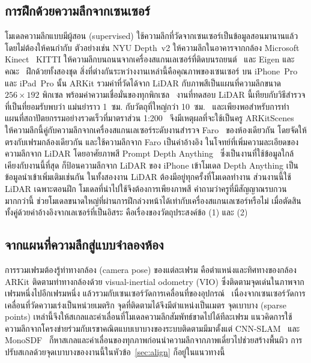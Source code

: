 \subsection{การฝึกด้วยความลึกจากเซนเซอร์}
โมเดลความลึกแบบมีผู้สอน (supervised) ใช้ความลึกที่วัดจากเซนเซอร์เป็นข้อมูลสอนมานานแล้ว โดยไม่ต้องให้คนกำกับ
ตัวอย่างเช่น NYU Depth~v2 ให้ความลึกในอาคารจากกล้อง Microsoft Kinect~\cite{nyuv2} KITTI ให้ความลึกบนถนนจากเครื่องสแกนเลเซอร์ที่ติดบนรถยนต์~\cite{kitti}
และ Eigen และคณะ~\cite{eigen14} ฝึกด้วยทั้งสองชุด สิ่งที่ต่างกันระหว่างงานเหล่านี้คือคุณภาพของเซนเซอร์
บน iPhone~Pro และ iPad~Pro นั้น ARKit รวมค่าที่วัดได้จาก LiDAR กับภาพสีเป็นแผนที่ความลึกขนาด
$256\times192$ พิกเซล พร้อมค่าความเชื่อมั่นของทุกพิกเซล~\cite{arkitscenes}
งานที่ทดสอบ LiDAR นี้เทียบกับวิธีสำรวจที่เป็นที่ยอมรับพบว่า แม่นยำราว 1~ซม. กับวัตถุที่ใหญ่กว่า 10~ซม.~\cite{luetzenburg}
และเพียงพอสำหรับการทำแผนที่สถาปัตยกรรมอย่างรวดเร็วที่มาตราส่วน 1:200~\cite{spreafico}
จึงมีเหตุผลที่จะใช้เป็นครู ARKitScenes~\cite{arkitscenes} ให้ความลึกนี้คู่กับความลึกจากเครื่องสแกนเลเซอร์ระดับงานสำรวจ
Faro~\cite{faro} ของห้องเดียวกัน โดยจัดให้ตรงกับเฟรมกล้องเดียวกัน และใช้ความลึกจาก Faro เป็นค่าอ้างอิง
ในโจทย์ที่เพิ่มความละเอียดของความลึกจาก LiDAR โดยอาศัยภาพสี
Prompt Depth Anything~\cite{promptda} ซึ่งเป็นงานที่ใช้ข้อมูลใกล้เคียงกับงานนี้ที่สุด ก็ป้อนความลึกจาก LiDAR ของ iPhone
เข้าโมเดล Depth Anything เป็นข้อมูลนำเข้าเพิ่มเติมเช่นกัน ในทั้งสองงาน LiDAR ต้องมีอยู่ทุกครั้งที่โมเดลทำงาน
ส่วนงานนี้ใช้ LiDAR เฉพาะตอนฝึก โมเดลที่นำไปใช้จึงต้องการเพียงภาพสี คำถามว่าครูที่มีสัญญาณรบกวนมากกว่านี้
ช่วยโมเดลขนาดใหญ่ที่ผ่านการฝึกล่วงหน้าได้เท่ากับเครื่องสแกนเลเซอร์หรือไม่
เมื่อตัดสินทั้งคู่ด้วยค่าอ้างอิงจากเลเซอร์ที่เป็นอิสระ คือเรื่องของวัตถุประสงค์ข้อ (1) และ (2)

\subsection{จากแผนที่ความลึกสู่แบบจำลองห้อง}
การรวมเฟรมต้องรู้ท่าทางกล้อง (camera pose) ของแต่ละเฟรม คือตำแหน่งและทิศทางของกล้อง
ARKit ติดตามท่าทางกล้องด้วย visual-inertial odometry (VIO) ซึ่งติดตามจุดเด่นในภาพจากเฟรมหนึ่งไปอีกเฟรมหนึ่ง
แล้วรวมกับเซนเซอร์วัดการเคลื่อนที่ของอุปกรณ์~\cite{vinsmono} เนื่องจากเซนเซอร์วัดการเคลื่อนที่วัดความเร่งเป็นหน่วยเมตริก
จุดที่ติดตามได้จึงมีตำแหน่งเป็นเมตร จุดเบาบาง (sparse points) เหล่านี้จึงให้สเกลและค่าเลื่อนที่โมเดลความลึกสัมพัทธ์ขาดไปได้ทีละเฟรม
แนวคิดการใช้ความลึกจากโครงข่ายร่วมกับเรขาคณิตแบบเบาบางของระบบติดตามมีมาตั้งแต่ CNN-SLAM~\cite{cnnslam}
และ MonoSDF~\cite{monosdf} ก็หาสเกลและค่าเลื่อนของทุกภาพก่อนนำความลึกจากภาพเดี่ยวไปช่วยสร้างพื้นผิว
การปรับสเกลด้วยจุดเบาบางของงานนี้ในหัวข้อ~\ref{sec:align} ก็อยู่ในแนวทางนี้

